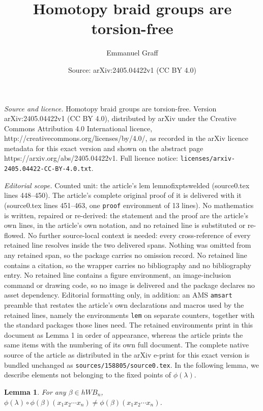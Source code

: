 \documentclass[10pt,a4paper]{amsart}
\title{Homotopy braid groups are torsion-free}
\author{Emmanuel Graff}
\date{Source: arXiv:2405.04422v1 (CC BY 4.0)}
\newtheorem{lem}{Lemma}
\begin{document}
\maketitle

\noindent\emph{Source and licence.} Homotopy braid groups are torsion-free. Version arXiv:2405.04422v1 (CC BY 4.0), distributed by arXiv under the Creative Commons Attribution 4.0 International licence, http://creativecommons.org/licenses/by/4.0/, as recorded in the arXiv licence metadata for this exact version and shown on the abstract page https://arxiv.org/abs/2405.04422v1. Full licence notice: \texttt{licenses/arxiv-2405.04422-CC-BY-4.0.txt}.\par\smallskip

\noindent\textit{Editorial scope.} Counted unit: the article's lem lemnofixptswelded (source0.tex lines 448--450). The article's complete original proof of it is delivered with it (source0.tex lines 451--463, one \texttt{proof} environment of 13 lines). No mathematics is written, repaired or re-derived: the statement and the proof are the article's own lines, in the article's own notation, and no retained line is substituted or re-flowed.  No further source-local context is needed: every cross-reference of every retained line resolves inside the two delivered spans.  Nothing was omitted from any retained span, so the package carries no omission record.  No retained line contains a citation, so the wrapper carries no bibliography and no bibliography entry.  No retained line contains a figure environment, an image-inclusion command or drawing code, so no image is delivered and the package declares no asset dependency.  Editorial formatting only, in addition: an AMS \texttt{amsart} preamble that restates the article's own declarations and macros used by the retained lines, namely the environments \texttt{lem} on separate counters, together with the standard packages those lines need.  The retained environments print in this document as Lemma 1 in order of appearance, whereas the article prints the same items with the numbering of its own full document.  The complete native source of the article as distributed in the arXiv e-print for this exact version is bundled unchanged as \texttt{sources/158805/source0.tex}.
In the following lemma, we describe elements not belonging to the fixed points of $\phi(\lambda)$.\begin{lem}\label{lemnofixptswelded}
For any $\beta\in hWB_n$, $\phi(\lambda)\circ\phi(\beta)(x_1x_2\cdots x_n)\neq\phi(\beta)(x_1x_2\cdots x_n)$.
\end{lem}
\end{document}
